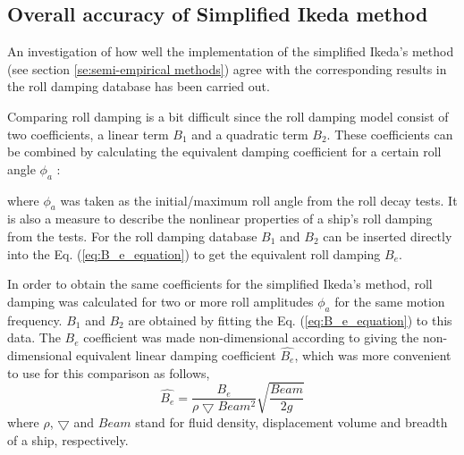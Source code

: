 \subsection{Overall accuracy of Simplified Ikeda method}
\label{se:overall_comparison}
An investigation of how well the implementation of the simplified Ikeda's method (see section \ref{se:semi-empirical methods}) agree with the corresponding results in the roll damping database has been carried out. 

Comparing roll damping is a bit difficult since the roll damping model consist of two coefficients, a linear term $B_1$ and a quadratic term $B_2$. These coefficients can be combined by calculating the equivalent damping coefficient for a certain roll angle $\phi_a$ \parencite{himeno_prediction_1981}:


where $\phi_a$ was taken as the initial/maximum roll angle from the roll decay tests. It is also a measure to describe the nonlinear properties of a ship's roll damping from the tests. For the roll damping database $B_1$ and $B_2$ can be inserted directly into the Eq. (\ref{eq:B_e_equation}) to get the equivalent roll damping $B_e$.

In order to obtain the same coefficients for the simplified Ikeda's method, roll damping was calculated for two or more roll amplitudes $\phi_a$ for the same motion frequency. $B_1$ and $B_2$ are obtained by fitting the Eq. (\ref{eq:B_e_equation}) to this data. The $B_e$ coefficient was made non-dimensional according to \parencite{himeno_prediction_1981}  giving the non-dimensional equivalent linear damping coefficient $\hat{B_e}$, which was more convenient to use for this comparison as follows,
\begin{equation} \label{eq:be_eqvalent}
    \hat{B_e} = \frac{B_e}{\rho \bigtriangledown Beam^2} \sqrt{\frac{Beam}{2g}}
\end{equation}
where $\rho$, $\bigtriangledown$ and $Beam$ stand for fluid density, displacement volume and breadth of a ship, respectively.


